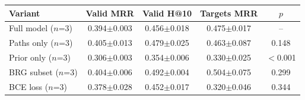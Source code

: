 \begin{tabular}{lcccc}
\toprule
Variant & Valid MRR & Valid H@10 & Targets MRR & $p$\\
\midrule
Full model ($n$=3) & 0.394$\pm$0.003 & 0.456$\pm$0.018 & 0.475$\pm$0.017 & --\\
Paths only ($n$=3) & 0.405$\pm$0.013 & 0.479$\pm$0.025 & 0.463$\pm$0.087 & 0.148\\
Prior only ($n$=3) & 0.306$\pm$0.003 & 0.354$\pm$0.006 & 0.330$\pm$0.025 & $<$0.001\\
BRG subset ($n$=3) & 0.404$\pm$0.006 & 0.492$\pm$0.004 & 0.504$\pm$0.075 & 0.299\\
BCE loss ($n$=3) & 0.378$\pm$0.028 & 0.452$\pm$0.017 & 0.320$\pm$0.046 & 0.344\\
\bottomrule
\end{tabular}